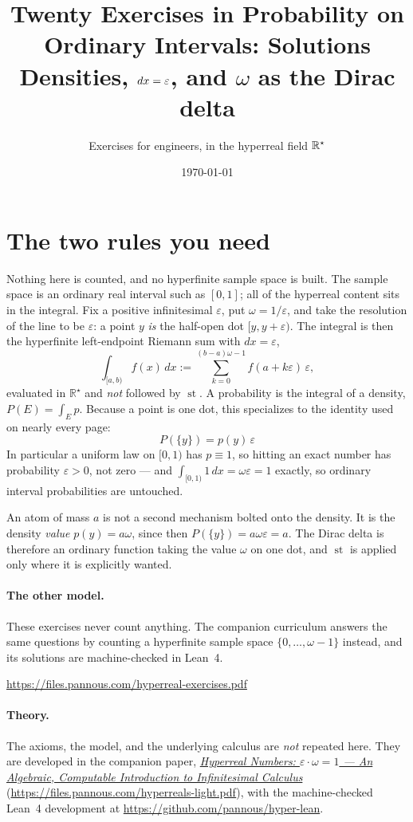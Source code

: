 \documentclass[11pt]{article}
\title{Twenty Exercises in Probability on Ordinary Intervals: Solutions\\
\large Densities, $dx=\eps$, and $\omega$ as the Dirac delta}
\author{Exercises for engineers, in the hyperreal field $\Rstar$}
\date{\today}
\newcommand{\Rstar}{\mathbb{R}^{\star}}
\newcommand{\eps}{\varepsilon}
\newcommand{\st}{\operatorname{st}}
\begin{document}
\maketitle


\section*{The two rules you need}

Nothing here is counted, and no hyperfinite sample space is built. The sample
space is an ordinary real interval such as $[0,1]$; all of the hyperreal
content sits in the integral. Fix a positive infinitesimal $\eps$, put
$\omega = 1/\eps$, and take the resolution of the line to be $\eps$: a point
$y$ \emph{is} the half-open dot $[y, y+\eps)$. The integral is then the
hyperfinite left-endpoint Riemann sum with $dx = \eps$,
\[
  \int_{[a,b)} f(x)\,dx
  := \sum_{k=0}^{(b-a)\omega-1} f(a+k\eps)\,\eps ,
\]
evaluated in $\Rstar$ and \emph{not} followed by $\st$. A probability is the
integral of a density, $P(E)=\int_E p$. Because a point is one dot, this
specializes to the identity used on nearly every page:
\[
  \boxed{\;P(\{y\}) = p(y)\,\eps\;}
\]
In particular a uniform law on $[0,1)$ has $p \equiv 1$, so hitting an exact
number has probability $\eps > 0$, not zero --- and $\int_{[0,1)} 1\,dx
= \omega\eps = 1$ exactly, so ordinary interval probabilities are untouched.

An atom of mass $a$ is not a second mechanism bolted onto the density. It is
the density \emph{value} $p(y)=a\omega$, since then $P(\{y\})=a\omega\eps=a$.
The Dirac delta is therefore an ordinary function taking the value $\omega$ on
one dot, and $\st$ is applied only where it is explicitly wanted.

\paragraph{The other model.} These exercises never count anything. The
companion curriculum answers the same questions by counting a hyperfinite
sample space $\{0,\dots,\omega-1\}$ instead, and its solutions are
machine-checked in Lean~4.
\begin{center}\small\url{https://files.pannous.com/hyperreal-exercises.pdf}\end{center}

\paragraph{Theory.} The axioms, the model, and the underlying calculus are
\emph{not} repeated here. They are developed in the companion paper,
\href{https://files.pannous.com/hyperreals-light.pdf}{\emph{Hyperreal Numbers: $\eps\cdot\omega=1$ --- An
Algebraic, Computable Introduction to Infinitesimal Calculus}}
(\url{https://files.pannous.com/hyperreals-light.pdf}), with the machine-checked Lean~4 development at
\url{https://github.com/pannous/hyper-lean}.
\end{document}
